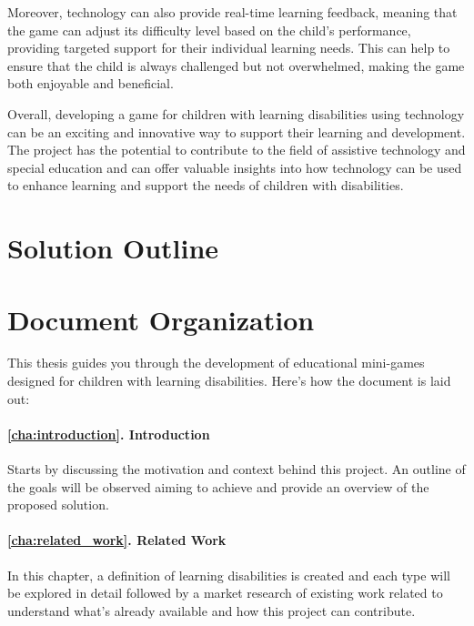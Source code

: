 Moreover, technology can also provide real-time learning feedback, meaning that the game can adjust its difficulty level based on the child's performance, providing targeted support for their individual learning needs. This can help to ensure that the child is always challenged but not overwhelmed, making the game both enjoyable and beneficial.

Overall, developing a game for children with learning disabilities using technology can be an exciting and innovative way to support their learning and development. The project has the potential to contribute to the field of assistive technology and special education and can offer valuable insights into how technology can be used to enhance learning and support the needs of children with disabilities.

\section{Solution Outline}

\section{Document Organization}

This thesis guides you through the development of educational mini-games designed for children with learning disabilities. Here’s how the document is laid out:

\paragraph{\ref{cha:introduction}. Introduction} Starts by discussing the motivation and context behind this project. An outline of the goals will be observed aiming to achieve and provide an overview of the proposed solution.

\paragraph{\ref{cha:related_work}. Related Work} In this chapter, a definition of learning disabilities is created and each type will be explored in detail followed by a market research of existing work related to understand what’s already available and how this project can contribute.

